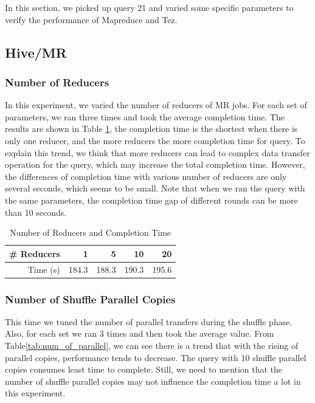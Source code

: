 \documentclass[10pt]{article}
\begin{document}
In this section, we picked up query 21 and varied some specific parameters to verify the performance of Mapreduce and Tez.

\subsection{Hive/MR}
\subsubsection{Number of Reducers}
In this experiment, we varied the number of reducers of MR jobs. For each set of parameters, we ran three times and took the average completion time. The results are shown in Table \ref{tab:num_of_reducers}, the completion time is the shortest when there is only one reducer, and the more reducers the more completion time for query. To explain this trend, we think that more reducers can lead to complex data transfer operation for the query, which may increase the total completion time. However, the differences of completion time with various number of reducers are only several seconds, which seems to be small. Note that when we ran the query with the same parameters, the completion time gap of different rounds can be more than 10 seconds.

\begin{table}[htbp]
  \centering
  \caption{Number of Reducers and Completion Time}
    \begin{tabular}{rrrrr}
    \toprule
    \# Reducers & 1     & 5     & 10    & 20 \\
    \midrule
    Time (s) & 184.3 & 188.3 & 190.3 & 195.6 \\
    \bottomrule
    \end{tabular}%
  \label{tab:num_of_reducers}%
\end{table}%

\subsubsection{Number of Shuffle Parallel Copies}

This time we tuned the number of parallel transfers during the shuffle phase. Also, for each set we ran 3 times and then took the average value. From Table\ref{tab:num_of_parallel}, we can see there is a trend that with the rising of parallel copies, performance tends to decrease. The query with 10 shuffle parallel copies consumes least time to complete. Still, we need to mention that the number of shuffle parallel copies may not influence the completion time a lot in this experiment.
\end{document}
